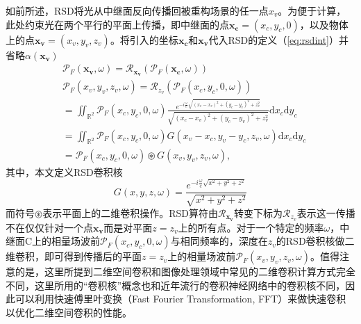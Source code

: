 \documentclass[master]{shtthesis}             %
\begin{document}
如前所述，RSD将光从中继面反向传播回被重构场景的任一点$x_v$。为便于计算，此处约束光在两个平行的平面上传播，即中继面的点$\mathbf{x_c}=(x_c,y_c,0)$，以及物体上的点$\mathbf{x_v}=(x_v,y_v,z_v)$。将引入的坐标$\mathbf{x_c}$和$\mathbf{x_v}$代入RSD的定义（\ref{eq:rsdint}）并省略$\alpha(\mathbf{x_v})$
\begin{equation}\label{eq:rsdconv}
  \begin{split}
    &\mathcal{P}_F(\mathbf{x_v},\omega) = \mathcal{R}_{\mathbf{x_v}}\left( \mathcal{P}_F(\mathbf{x_c},\omega) \right) \\
    &\mathcal{P}_F(x_v,y_v,z_v,\omega) = \mathcal{R}_{z_v}\left( \mathcal{P}_F(x_c,y_c,0,\omega) \right)\\
    &= \iint_{\mathbb{R}^2}\mathcal{P}_F(x_c,y_c,0,\omega)\frac{e^{-i\frac{\omega}{c}\sqrt{(x_c-x_v)^2+(y_c-y_v)^2+z_v^2}}}{\sqrt{(x_c-x_v)^2+(y_c-y_v)^2+z_v^2}} \text{d}x_c\text{d}y_c \\
    &= \iint_{\mathbb{R}^2}\mathcal{P}_F(x_c,y_c,0,\omega) G(x_v-x_c,y_v-y_c,z_v,\omega) \text{d}x_c\text{d}y_c \\
    &= \mathcal{P}_F(x_c,y_c,0,\omega) \circledast G(x_v,y_v,z_v,\omega),
  \end{split}
\end{equation}
其中，本文定义RSD卷积核
\begin{equation}
  G(x,y,z,\omega) = \frac{e^{-i\frac{\omega}{c}\sqrt{x^2+y^2+z^2}}}{\sqrt{x^2+y^2+z^2}}
\end{equation}
而符号$\circledast$表示平面上的二维卷积操作。RSD算符由$\mathcal{R}_{\mathbf{x_v}}$转变下标为$\mathcal{R}_{z_v}$表示这一传播不在仅仅针对一个点$\mathbf{x_v}$而是对平面$z=z_v$上的所有点。对于一个特定的频率$\omega$，中继面C上的相量场波前$\mathcal{P}_F(x_c,y_c,0,\omega)$与相同频率的，深度在$z_v$的RSD卷积核做二维卷积，即可得到传播后的平面$z=z_v$上的相量场波前$\mathcal{P}_F(x_v,y_v,z_v,\omega)$。值得注意的是，这里所提到二维空间卷积和图像处理领域中常见的二维卷积计算方式完全不同，这里所用的“卷积核”概念也和近年流行的卷积神经网络中的卷积核不同，因此可以利用快速傅里叶变换（Fast Fourier Transformation, FFT）来做快速卷积以优化二维空间卷积的性能。

\end{document}
